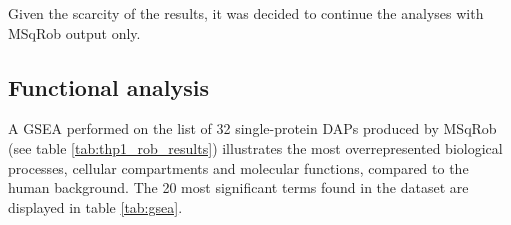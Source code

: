 Given the scarcity of the results, it was decided to continue the analyses with MSqRob output only.

\subsection{Functional analysis}

A \ac{GSEA} performed on the list of 32 single-protein \ac{DAP}s produced by MSqRob (see table \ref{tab:thp1_rob_results}) illustrates the most overrepresented biological processes, cellular compartments and molecular functions, compared to the human background. The 20 most significant terms found in the dataset are displayed in table \ref{tab:gsea}.


\small
\begin{table}[!h]
\centering


\end{table}
